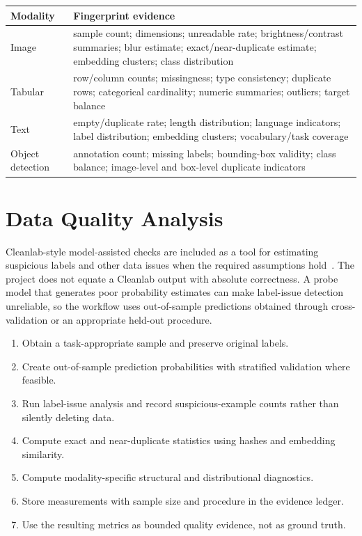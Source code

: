 \documentclass[11pt]{article}
\begin{document}
\begin{longtable}{@{}L{2.6cm}L{10.9cm}@{}}
\toprule
\textbf{Modality} & \textbf{Fingerprint evidence} \\
\midrule
\endhead
Image & sample count; dimensions; unreadable rate; brightness/contrast summaries; blur estimate;
  exact/near-duplicate estimate; embedding clusters; class distribution \\
Tabular & row/column counts; missingness; type consistency; duplicate rows; categorical cardinality;
  numeric summaries; outliers; target balance \\
Text & empty/duplicate rate; length distribution; language indicators; label distribution; embedding
  clusters; vocabulary/task coverage \\
Object detection & annotation count; missing labels; bounding-box validity; class balance; image-level and
  box-level duplicate indicators \\
\bottomrule
\end{longtable}

\section{Data Quality Analysis}
Cleanlab-style model-assisted checks are included as a tool for estimating suspicious labels and other data
issues when the required assumptions hold~\cite{cleanlab}. The project does not equate a Cleanlab output
with absolute correctness. A probe model that generates poor probability estimates can make label-issue
detection unreliable, so the workflow uses out-of-sample predictions obtained through cross-validation or
an appropriate held-out procedure.

\begin{enumerate}[leftmargin=*]
\item Obtain a task-appropriate sample and preserve original labels.
\item Create out-of-sample prediction probabilities with stratified validation where feasible.
\item Run label-issue analysis and record suspicious-example counts rather than silently deleting data.
\item Compute exact and near-duplicate statistics using hashes and embedding similarity.
\item Compute modality-specific structural and distributional diagnostics.
\item Store measurements with sample size and procedure in the evidence ledger.
\item Use the resulting metrics as bounded quality evidence, not as ground truth.
\end{enumerate}
\end{document}
